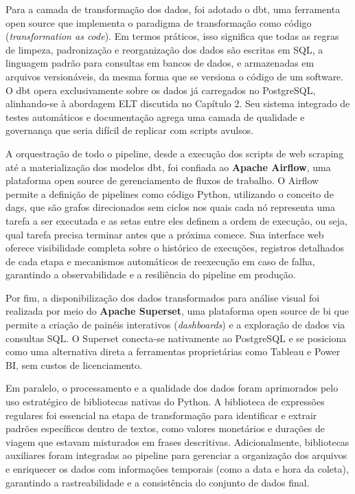 Para a camada de transformação dos dados, foi adotado o \ac{dbt}, uma ferramenta open source que implementa o paradigma de transformação como código (\textit{transformation as code}). Em termos práticos, isso significa que todas as regras de limpeza, padronização e reorganização dos dados são escritas em SQL, a linguagem padrão para consultas em bancos de dados, e armazenadas em arquivos versionáveis, da mesma forma que se versiona o código de um software. O dbt opera exclusivamente sobre os dados já carregados no PostgreSQL, alinhando-se à abordagem ELT discutida no Capítulo 2. Seu sistema integrado de testes automáticos e documentação agrega uma camada de qualidade e governança que seria difícil de replicar com scripts avulsos.

A orquestração de todo o pipeline, desde a execução dos scripts de web scraping até a materialização dos modelos dbt, foi confiada ao \textbf{Apache Airflow}, uma plataforma open source de gerenciamento de fluxos de trabalho. O Airflow permite a definição de pipelines como código Python, utilizando o conceito de \acs{dags}, que são grafos direcionados sem ciclos nos quais cada nó representa uma tarefa a ser executada e as setas entre eles definem a ordem de execução, ou seja, qual tarefa precisa terminar antes que a próxima comece. Sua interface web oferece visibilidade completa sobre o histórico de execuções, registros detalhados de cada etapa e mecanismos automáticos de reexecução em caso de falha, garantindo a observabilidade e a resiliência do pipeline em produção.

Por fim, a disponibilização dos dados transformados para análise visual foi realizada por meio do \textbf{Apache Superset}, uma plataforma open source de \acs{bi} que permite a criação de painéis interativos (\textit{dashboards}) e a exploração de dados via consultas SQL. O Superset conecta-se nativamente ao PostgreSQL e se posiciona como uma alternativa direta a ferramentas proprietárias como Tableau e Power BI, sem custos de licenciamento.

Em paralelo, o processamento e a qualidade dos dados foram aprimorados pelo uso estratégico de bibliotecas nativas do Python. A biblioteca de expressões regulares foi essencial na etapa de transformação para identificar e extrair padrões específicos dentro de textos, como valores monetários e durações de viagem que estavam misturados em frases descritivas. Adicionalmente, bibliotecas auxiliares foram integradas ao pipeline para gerenciar a organização dos arquivos e enriquecer os dados com informações temporais (como a data e hora da coleta), garantindo a rastreabilidade e a consistência do conjunto de dados final.


